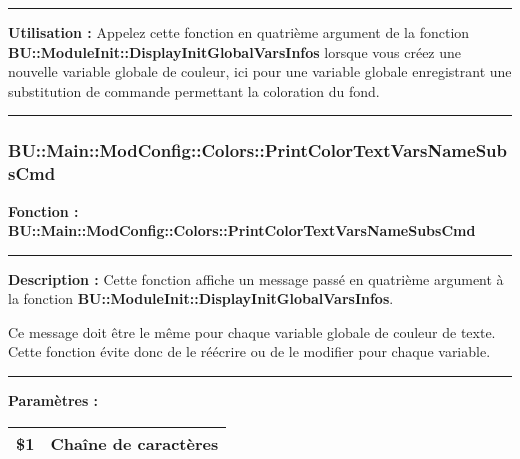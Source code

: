 \documentclass[a4paper,10pt]{article}
\begin{document}

\par\noindent\rule{\textwidth}{0.4pt}

\begin{justify}
    \textbf{Utilisation :} Appelez cette fonction en quatrième argument de la fonction \textbf{\color{func}BU::ModuleInit::DisplayInitGlobalVarsInfos} lorsque vous créez une nouvelle variable globale de couleur, ici pour une variable globale enregistrant une substitution de commande permettant la coloration du fond.
\end{justify}



\color{sec3}\par\noindent\rule{\textwidth}{0.4pt}\color{text}

\color{sec3}
\subsubsection{BU::Main::ModConfig::Colors::PrintColorTextVarsNameSubsCmd}\color{text}

\begin{justify}
    \textbf{Fonction : \color{func}BU::Main::ModConfig::Colors::PrintColorTextVarsNameSubsCmd}
\end{justify}


\par\noindent\rule{\textwidth}{0.4pt}

\begin{justify}
    \textbf{Description :} Cette fonction affiche un message passé en quatrième argument à la fonction \textbf{\color{func}BU::ModuleInit::DisplayInitGlobalVarsInfos}.
\end{justify}

\begin{justify}
    Ce message doit être le même pour chaque variable globale de couleur de texte. Cette fonction évite donc de le réécrire ou de le modifier pour chaque variable.
\end{justify}


\par\noindent\rule{\textwidth}{0.4pt}

\begin{justify}
    \textbf{Paramètres :}

    \begin{tabular}{|l|l|}
        \hline
        \textbf{\color{vars}\$1} & Chaîne de caractères\\
        \hline
    \end{tabular}
\end{justify}
\end{document}
